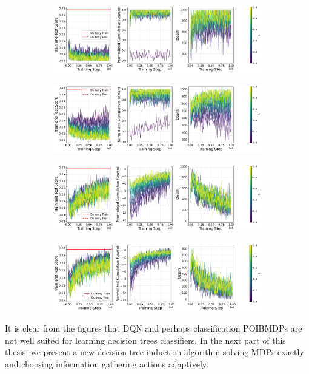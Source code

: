 \begin{figure}
    \begin{subfigure}{0.8\textwidth}
    \centering
    \includegraphics[width=\textwidth]{images/images_part1/training_curves.pdf}
    \caption{}\label{fig:tree-distrib-classif-poibmdp}
    \end{subfigure}
    
    \begin{subfigure}{0.8\textwidth}
    \centering
    \includegraphics[width=\textwidth]{images/images_part1/training_curves_lessp.pdf}
    \caption{}\label{fig:tree-distrib-classif-poibmdp}
    \end{subfigure}
    
    \begin{subfigure}{0.8\textwidth}
    \centering
    \includegraphics[width=\textwidth]{images/images_part1/training_curves_md3.pdf}
    \caption{}\label{fig:tree-distrib-classif-poibmdp}
    \end{subfigure}
   
    \begin{subfigure}{0.8\textwidth}
    \centering
    \includegraphics[width=\textwidth]{images/images_part1/training_curves_lessp_md3.pdf}
    \caption{}\label{fig:tree-distrib-classif-poibmdp}
    \end{subfigure}
\caption{}
\end{figure}

It is clear from the figures that DQN and perhaps classification POIBMDPs are not well suited for learning decision trees classifiers.
In the next part of this thesis; we present a new decision tree induction algorithm solving MDPs exactly and choosing information gathering actions adaptively.



